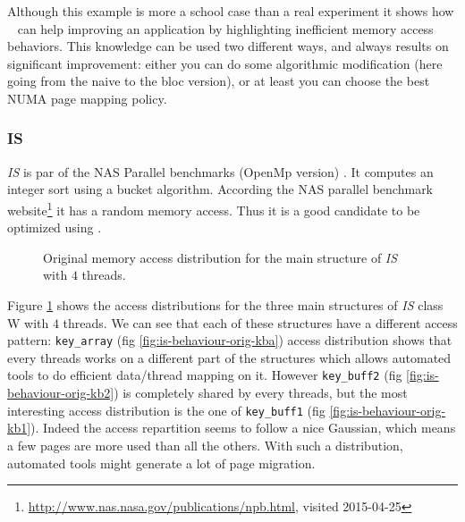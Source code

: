 Although this example is more a school case than a real experiment it shows
how \TABARNAC~ can help improving an application by highlighting inefficient
memory access behaviors. This knowledge can be used two different ways, and always
results on significant improvement: either you can do some algorithmic
modification (here going from the naive to the bloc version), or at least you
can choose the best NUMA page mapping policy.

\subsubsection{IS}
\label{sec:exp-is}

\emph{IS} is par of the NAS Parallel benchmarks (OpenMp version)
\cite{Feng04Unstructured}.  It computes an integer sort using a bucket
algorithm. According the NAS parallel benchmark
website\footnote{\url{http://www.nas.nasa.gov/publications/npb.html}, visited
2015-04-25} it has a random memory access. Thus it is a good candidate to be
optimized using \TABARNAC.

\begin{figure}[htb]
    \centering

    \caption{Original memory access distribution for the main structure of
        \emph{IS} with $4$ threads.}
    \label{fig:is-behaviour-orig}
\end{figure}

Figure \ref{fig:is-behaviour-orig} shows the access distributions for the
three main structures of \emph{IS} class W with $4$ threads. We can see that
each of these structures have a different access pattern: \texttt{key\_array}
(fig \ref{fig:is-behaviour-orig-kba}) access distribution shows that every
threads works on a different part of the structures which allows automated
tools to do efficient data/thread mapping on it. However \texttt{key\_buff2}
(fig \ref{fig:is-behaviour-orig-kb2}) is completely shared by every threads,
but the most interesting access distribution is the one of \texttt{key\_buff1}
(fig \ref{fig:is-behaviour-orig-kb1}). Indeed the access repartition seems to
follow a nice Gaussian, which means a few pages are more used than all the
others. With such a distribution, automated tools might generate a lot of page
migration.

